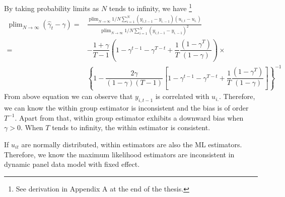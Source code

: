 \documentclass[12pt,a4paper,hyperref]{article}
\DeclareMathOperator*{\plim}{plim}
\begin{document}
By taking probability limits as $N$ tends to infinity, we have \footnote{See derivation in Appendix A at the end of the thesis.}
\begin{equation}
\begin{split}
\plim_{N \rightarrow \infty} \left( \hat{\gamma}_{t}-\gamma\right) =&\frac{\plim_{N \rightarrow \infty}1/N \sum^{N}_{i=1}(y_{i,t-1}-y_{i.-1})(u_{i,t}-u_	{i.})}{\plim_{N \rightarrow \infty}1/N \sum^{N}_{i=1}(y_{i,t-1}-y_{i.-1})^{2}}
\\
= &
-\dfrac{1+\gamma}{T-1}\left(1-\gamma^{t-1}-\gamma^{T-t}+\dfrac{1}{T}\dfrac{\left(1-\gamma^{T}\right)}{\left( 1-\gamma\right)}   \right)\times \\
&\left\lbrace 1-\dfrac{2\gamma}{\left(1-\gamma \right) \left(T-1 \right)}\left[ 1-\gamma^{t-1}-\gamma^{T-t}+\dfrac{1}{T}\dfrac{\left( 1-\gamma^{T}\right)}{\left(1-\gamma \right)}\right]    \right\rbrace^{-1} 
\end{split}
\end{equation}
From above equation we can observe that $y_{i,t-1}$ is correlated with $u_{i.}$. Therefore, we can know the within group estimator is inconsistent and the bias is of order $T^{-1}$. Apart from that, within group estimator exhibits a downward bias when $\gamma>0$.  When $T$ tends to infinity, the within estimator is consistent.

If $u_{it}$ are normally distributed, within estimators are also the ML estimators.
Therefore, we know the maximum likelihood estimators are inconsistent in dynamic panel data model with fixed effect.
\end{document}
